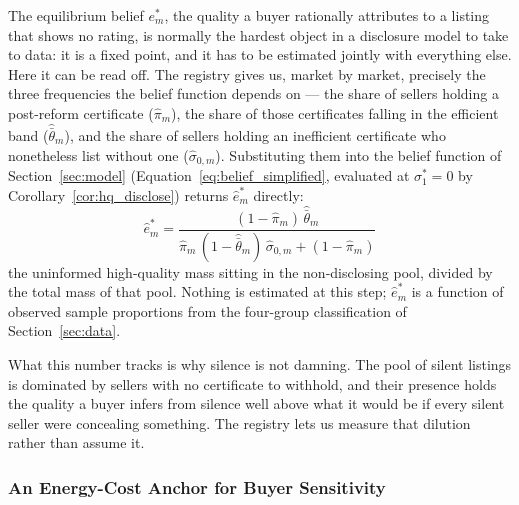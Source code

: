 The equilibrium belief $e^*_m$, the quality a buyer rationally attributes to a listing that shows no rating, is normally the hardest object in a disclosure model to take to data: it is a fixed point, and it has to be estimated jointly with everything else. Here it can be read off. The registry gives us, market by market, precisely the three frequencies the belief function depends on --- the share of sellers holding a post-reform certificate ($\hat\pi_m$), the share of those certificates falling in the efficient band ($\hat{\bar\theta}_m$), and the share of sellers holding an inefficient certificate who nonetheless list without one ($\hat\sigma_{0,m}$). Substituting them into the belief function of Section~\ref{sec:model} (Equation~\eqref{eq:belief_simplified}, evaluated at $\sigma_1^*=0$ by Corollary~\ref{cor:hq_disclose}) returns $\hat e^*_m$ directly:
\begin{equation}
    \hat{e}^*_m = \frac{(1-\hat\pi_m)\,\hat{\bar\theta}_m}{\hat\pi_m\,(1-\hat{\bar\theta}_m)\,\hat\sigma_{0,m} + (1-\hat\pi_m)}
    \label{eq:estar}
\end{equation}
the uninformed high-quality mass sitting in the non-disclosing pool, divided by the total mass of that pool. Nothing is estimated at this step; $\hat e^*_m$ is a function of observed sample proportions from the four-group classification of Section~\ref{sec:data}.

What this number tracks is why silence is not damning. The pool of silent listings is dominated by sellers with no certificate to withhold, and their presence holds the quality a buyer infers from silence well above what it would be if every silent seller were concealing something. The registry lets us measure that dilution rather than assume it.

\subsubsection{An Energy-Cost Anchor for Buyer Sensitivity}


